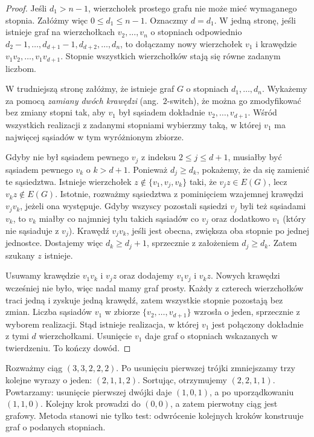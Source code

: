 \begin{proof}
Jeśli $d_1>n-1$, wierzchołek prostego grafu
nie może mieć wymaganego stopnia. Załóżmy więc
$0\le d_1\le n-1$. Oznaczmy $d=d_1$.
W jedną stronę, jeśli istnieje graf na wierzchołkach
$v_2,\ldots,v_n$ o stopniach odpowiednio
$d_2-1,\ldots,d_{d+1}-1,d_{d+2},\ldots,d_n$,
to dołączamy nowy wierzchołek $v_1$ i krawędzie
$v_1v_2,\ldots,v_1v_{d+1}$. Stopnie wszystkich
wierzchołków stają się równe zadanym liczbom.

W trudniejszą stronę załóżmy, że istnieje graf $G$
o stopniach $d_1,\ldots,d_n$. Wykażemy za pomocą
\emph{zamiany dwóch krawędzi} (ang.\ $2$-switch), że
można go zmodyfikować bez zmiany stopni tak,
aby $v_1$ był sąsiadem dokładnie $v_2,\ldots,v_{d+1}$.
Wśród wszystkich realizacji z zadanymi stopniami
wybierzmy taką, w której $v_1$ ma najwięcej
sąsiadów w tym wyróżnionym zbiorze.

Gdyby nie był sąsiadem pewnego $v_j$ z indeksu
$2\le j\le d+1$, musiałby być sąsiadem pewnego
$v_k$ o $k>d+1$. Ponieważ $d_j\ge d_k$, pokażemy,
że da się zamienić te sąsiedztwa. Istnieje
wierzchołek $z\notin\{v_1,v_j,v_k\}$ taki,
że $v_jz\in E(G)$, lecz $v_kz\notin E(G)$.
Istotnie, rozważmy sąsiedztwa z pominięciem
wzajemnej krawędzi $v_jv_k$, jeżeli ona występuje.
Gdyby wszyscy pozostali sąsiedzi $v_j$ byli też
sąsiadami $v_k$, to $v_k$ miałby co najmniej
tylu takich sąsiadów co $v_j$ oraz dodatkowo
$v_1$ (który nie sąsiaduje z $v_j$).
Krawędź $v_jv_k$, jeśli jest obecna, zwiększa oba
stopnie po jednej jednostce. Dostajemy więc
$d_k\ge d_j+1$, sprzecznie z założeniem
$d_j\ge d_k$. Zatem szukany $z$ istnieje.

Usuwamy krawędzie $v_1v_k$ i $v_jz$ oraz
dodajemy $v_1v_j$ i $v_kz$. Nowych krawędzi
wcześniej nie było, więc nadal mamy graf prosty.
Każdy z czterech wierzchołków traci jedną i zyskuje
jedną krawędź, zatem wszystkie stopnie pozostają
bez zmian. Liczba sąsiadów $v_1$ w zbiorze
$\{v_2,\ldots,v_{d+1}\}$ wzrosła o jeden,
sprzecznie z wyborem realizacji. Stąd istnieje
realizacja, w której $v_1$ jest połączony
dokładnie z tymi $d$ wierzchołkami.
Usunięcie $v_1$ daje graf o stopniach wskazanych
w twierdzeniu. To kończy dowód.
\end{proof}

\begin{przyklad}
Rozważmy ciąg $(3,3,2,2,2)$. Po usunięciu
pierwszej trójki zmniejszamy trzy kolejne wyrazy o jeden:
$(2,1,1,2)$. Sortując, otrzymujemy $(2,2,1,1)$.
Powtarzamy: usunięcie pierwszej dwójki daje
$(1,0,1)$, a po uporządkowaniu $(1,1,0)$.
Kolejny krok prowadzi do $(0,0)$, a zatem
pierwotny ciąg jest grafowy. Metoda stanowi
nie tylko test: odwrócenie kolejnych kroków
konstruuje graf o podanych stopniach.
\end{przyklad}

